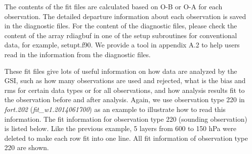 The contents of the fit files are calculated based on O-B or O-A for each observation. The detailed departure information about each observation is saved in the diagnostic files. For the content of the diagnostic files, please check the content of the array rdiagbuf in one of the setup subroutines for conventional data, for example, setupt.f90. We provide a tool in appendix A.2 to help users read in the information from the diagnostic files.

These fit files give lots of useful information on how data are analyzed by the GSI, such as how many observations are used and rejected, what is the bias and rms for certain data types or for all observations, and how analysis results fit to the observation before and after analysis. Again, we use observation type 220 in \textit{fort.202} (\textit{fit\_w1.2014061700}) as an example to illustrate how to read this information. The fit information for observation type 220 (sounding observation) is listed below. Like the previous example, 5 layers from 600 to 150 hPa were deleted to make each row fit into one line. All fit information of observation type 220 are shown. 

